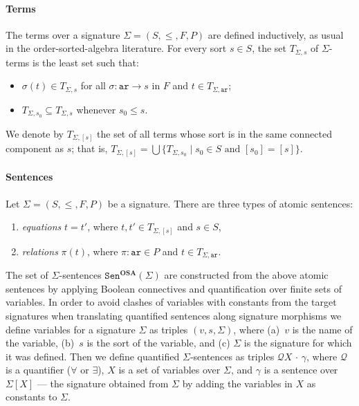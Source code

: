 \documentclass{article}
\newcommand{\OSA}{{\mathbf{OSA}}}
\newcommand{\Sen}{\mathtt{Sen}}
\newcommand{\ari}{\mathtt{ar}}
\newcommand{\Q}[1]{\mathcal{Q}#1\,{\cdot}\,}
\begin{document}
\paragraph{Terms}
The terms over a signature $\Sigma=(S,\leq,F,P)$ are defined inductively, as usual in the order-sorted-algebra literature.
For every sort $s \in S$, the set $T_{\Sigma, s}$ of $\Sigma$-terms is the least set such that:
\begin{itemize}
	\item $\sigma(t) \in T_{\Sigma, s}$ for all $\sigma \colon \ari \to s$ in $F$ and $t \in T_{\Sigma, \ari}$;
	
	\item $T_{\Sigma, s_0} \subseteq T_{\Sigma, s}$ whenever $s_0 \leq s$.
\end{itemize}
We denote by $T_{\Sigma, [s]}$ the set of all terms whose sort is in the same connected component as $s$; that is, $T_{\Sigma, [s]} = \bigcup \{ T_{\Sigma, s_0} \mid s_0\in S \mbox{ and } [s_0] = [s] \}$.

\paragraph{Sentences}
Let $\Sigma=(S,\leq,F,P)$ be a signature. 
There are three types of atomic sentences:
\begin{enumerate}
 \item \emph{equations} $t=t'$, where $t,t'\in T_{\Sigma,[s]}$ and $s\in S$,


 \item \emph{relations} $\pi(t)$, where $\pi:\ari\in P$ and $t\in T_{\Sigma,\ari}$.
\end{enumerate}
The set of $\Sigma$-sentences $\Sen^\OSA(\Sigma)$ are constructed from the above atomic sentences by applying Boolean connectives and quantification over finite sets of variables.
In order to avoid clashes of variables with constants from the target signatures when translating quantified sentences along signature morphisms we define variables for a signature $\Sigma$ as triples $(v,s,\Sigma)$, where 
 (a)~$v$ is the name of the variable, 
 (b)~$s$ is the sort of the variable, and
 (c) $\Sigma$ is the signature for which it was defined.
 Then we define quantified $\Sigma$-sentences as triples $\Q{X}\gamma$, where $\mathcal{Q}$ is a quantifier ($\forall$ or $\exists$), $X$ is a set of variables over $\Sigma$, and $\gamma$ is a sentence over $\Sigma[X]$ --- the signature obtained from $\Sigma$ by adding the variables in $X$ as constants to $\Sigma$.
\end{document}
